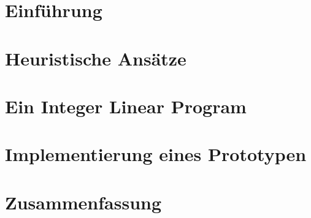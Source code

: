 
\label{ch:Content1}

\section{Einführung}



\section{Heuristische Ansätze}



\section{Ein Integer Linear Program}



\section{Implementierung eines Prototypen}



\section{Zusammenfassung}


